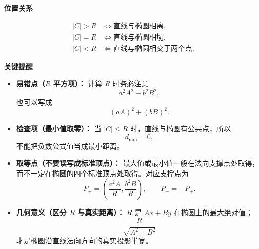 \begin{summarybox}
	\textbf{\textcolor{CSummary}{位置关系}}

	\[
		\left.
		\begin{aligned}
			|C|>R & \Longleftrightarrow \text{直线与椭圆相离},     \\
			|C|=R & \Longleftrightarrow \text{直线与椭圆相切},     \\
			|C|<R & \Longleftrightarrow \text{直线与椭圆相交于两个点}.
		\end{aligned}
		\right.
	\]

	\medskip

	\textbf{\textcolor{CSummary}{关键提醒}}

	\begin{itemize}[leftmargin=*, itemsep=0.5em, topsep=0.4em]
		\item \textbf{易错点（\(R\) 平方项）：}
		      计算 \(R\) 时务必注意
		      \[
			      a^2A^2+b^2B^2,
		      \]
		      也可以写成
		      \[
			      (aA)^2+(bB)^2.
		      \]

		\item \textbf{检查项（最小值取零）：}
		      当 \(|C|\le R\) 时，直线与椭圆有公共点，所以
		      \[
			      d_{\min}=0,
		      \]
		      不能把负数公式值当成最小距离。

		\item \textbf{取等点（不要误写成标准顶点）：}
		      最大值或最小值一般在法向支撑点处取得，而不一定在椭圆的四个标准顶点处取得。对应支撑点为
		      \[
			      P_+=\left(\frac{a^2A}{R},\frac{b^2B}{R}\right),
			      \qquad
			      P_-=-P_+.
		      \]

		\item \textbf{几何意义（区分 \(R\) 与真实距离）：}
		      \(R\) 是 \(Ax+By\) 在椭圆上的最大绝对值；
		      \[
			      \frac{R}{\sqrt{A^2+B^2}}
		      \]
		      才是椭圆沿直线法向方向的真实投影半宽。
	\end{itemize}

\end{summarybox}